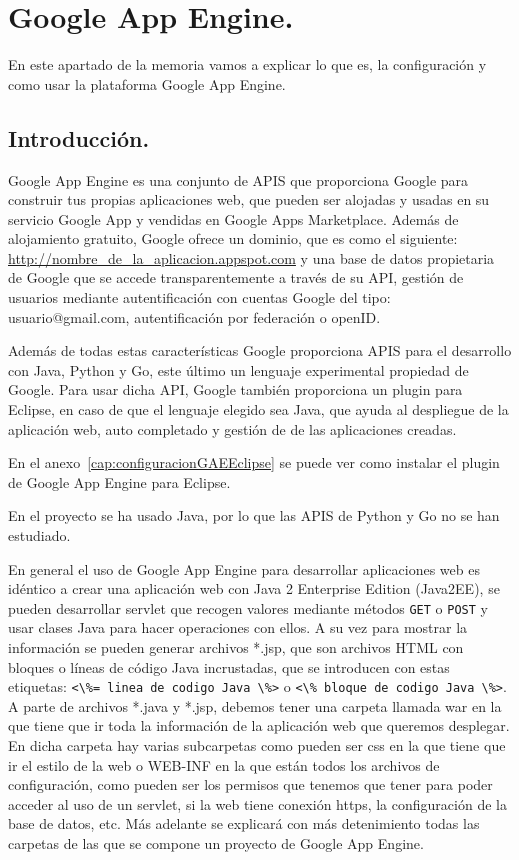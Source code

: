 \chapter{Google App Engine.}\label{cap:GAE}
En este apartado de la memoria vamos a explicar lo que es, la configuración y como usar la plataforma Google App Engine.

\section{Introducción.}
Google App Engine es una conjunto de APIS que proporciona Google para construir tus propias aplicaciones web, que pueden ser alojadas y usadas en su servicio Google App y vendidas en Google Apps Marketplace. Además de alojamiento gratuito, Google ofrece un dominio, que es como el siguiente: \url{http://nombre\_de\_la\_aplicacion.appspot.com} y una base de datos propietaria de Google que se accede transparentemente a través de su API, gestión de usuarios mediante autentificación con cuentas Google del tipo: usuario@gmail.com, autentificación por federación o openID.

Además de todas estas características Google proporciona APIS para el desarrollo con Java, Python y Go, este último un lenguaje experimental propiedad de Google. Para usar dicha API, Google también proporciona un plugin para Eclipse, en caso de que el lenguaje elegido sea Java, que ayuda al despliegue de la aplicación web, auto completado y gestión de de las aplicaciones creadas. 

En el anexo~\ref{cap:configuracionGAEEclipse} se puede ver como instalar el plugin de Google App Engine para Eclipse.

En el proyecto se ha usado Java, por lo que las APIS de Python y Go no se han estudiado.

En general el uso de Google App Engine para desarrollar aplicaciones web es idéntico a crear una aplicación web con Java 2 Enterprise Edition (Java2EE), se pueden desarrollar servlet que recogen valores mediante métodos \lstinline{GET} o \lstinline{POST} y usar clases Java para hacer operaciones con ellos. A su vez para mostrar la información se pueden generar archivos *.jsp, que son archivos HTML con bloques o líneas de código Java incrustadas, que se introducen con estas etiquetas: \lstinline{<\%= linea de codigo Java \%>} o \lstinline{<\% bloque de codigo Java \%>}. A parte de archivos *.java y *.jsp, debemos tener una carpeta llamada war en la que tiene que ir toda la información de la aplicación web que queremos desplegar. En dicha carpeta hay varias subcarpetas como pueden ser css en la que tiene que ir el estilo de la web o WEB-INF en la que están todos los archivos de configuración, como pueden ser los permisos que tenemos que tener para poder acceder al uso de un servlet, si la web tiene conexión https, la configuración de la base de datos, etc. Más adelante se explicará con más detenimiento todas las carpetas de las que se compone un proyecto de Google App Engine.

